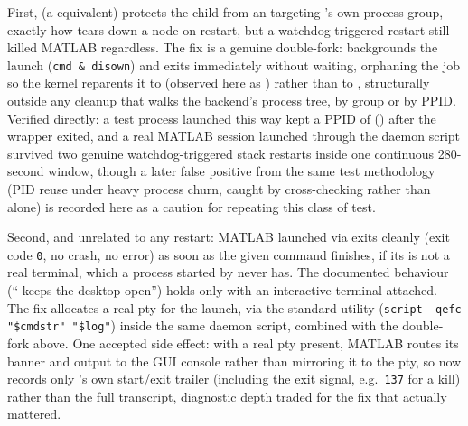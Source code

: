 First,  (a  equivalent) protects
the child from an  targeting 's own
process group, exactly how  tears down a node on
restart, but a watchdog-triggered restart still killed MATLAB regardless.
The fix is a genuine double-fork:  backgrounds
the launch (\verb|cmd & disown|) and exits immediately without waiting,
orphaning the job so the kernel reparents it to  (observed here as
) rather than to , structurally
outside any cleanup that walks the backend's process tree, by group or by
PPID. Verified directly: a test process launched this way kept a PPID of
 () after the wrapper exited, and a real
MATLAB session launched through the daemon script survived two genuine
watchdog-triggered stack restarts inside one continuous 280-second window, though a later false positive from the same test methodology (PID reuse
under heavy process churn, caught by cross-checking 
rather than  alone) is recorded here as a caution for repeating
this class of test.

Second, and unrelated to any restart: MATLAB launched via  exits
cleanly (exit code \texttt{0}, no crash, no error) as soon as the given
command finishes, if its  is not a real terminal, which a
process started by  never has. The documented behaviour (``
keeps the desktop open'') holds only with an interactive terminal attached.
The fix allocates a real pty for the launch, via the standard 
utility (\verb|script -qefc "$cmdstr" "$log"|) inside the same daemon script,
combined with the double-fork above. One accepted side effect: with a real
pty present, MATLAB routes its banner and  output to the GUI
console rather than mirroring it to the pty, so 
now records only 's own start/exit trailer (including the exit
signal, e.g.\ \texttt{137} for a kill) rather than the full transcript,
diagnostic depth traded for the fix that actually mattered.

